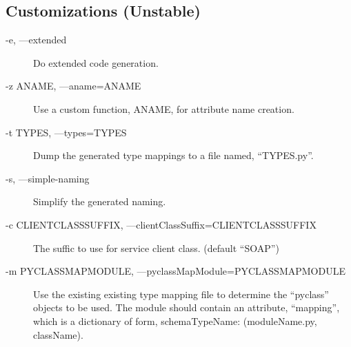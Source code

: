 \subsection{Customizations (Unstable) }
\begin{description}
\item[-e, ---extended] Do extended code generation.
\item[-z ANAME, ---aname=ANAME] Use a custom function, ANAME, for attribute name
creation.
\item[-t TYPES, ---types=TYPES] Dump the generated type mappings to a file
named, ``TYPES.py''.
\item[-s, ---simple-naming] Simplify the generated naming.
\item[-c CLIENTCLASSSUFFIX, ---clientClassSuffix=CLIENTCLASSSUFFIX] The suffic
to use for service client class. (default ``SOAP'')
\item[-m PYCLASSMAPMODULE, ---pyclassMapModule=PYCLASSMAPMODULE] Use the
existing existing type mapping file to determine the ``pyclass'' objects to be
used.  The module should contain an attribute, ``mapping'', which is a
dictionary of form, {schemaTypeName: (moduleName.py, className)}.
\end{description}
